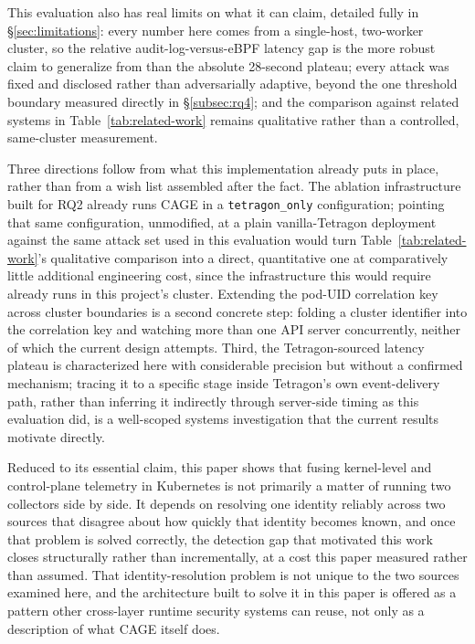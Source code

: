 \documentclass{ieeeaccess}
\begin{document}
This evaluation also has real limits on what it can claim, detailed
fully in \S\ref{sec:limitations}: every number here comes from a
single-host, two-worker cluster, so the relative audit-log-versus-eBPF
latency gap is the more robust claim to generalize from than the
absolute 28-second plateau; every attack was fixed and disclosed
rather than adversarially adaptive, beyond the one threshold boundary
measured directly in \S\ref{subsec:rq4}; and the comparison against
related systems in Table~\ref{tab:related-work} remains qualitative
rather than a controlled, same-cluster measurement.

Three directions follow from what this implementation already puts in
place, rather than from a wish list assembled after the fact. The
ablation infrastructure built for RQ2 already runs CAGE in a
\texttt{tetragon\_only} configuration; pointing that same configuration,
unmodified, at a plain vanilla-Tetragon deployment against the same
attack set used in this evaluation would turn
Table~\ref{tab:related-work}'s qualitative comparison into a direct,
quantitative one at comparatively little additional engineering cost,
since the infrastructure this would require already runs in this
project's cluster. Extending the pod-UID correlation key across
cluster boundaries is a second concrete step: folding a cluster
identifier into the correlation key and watching more than one API
server concurrently, neither of which the current design attempts.
Third, the Tetragon-sourced latency plateau is characterized here with
considerable precision but without a confirmed mechanism; tracing it
to a specific stage inside Tetragon's own event-delivery path, rather
than inferring it indirectly through server-side timing as this
evaluation did, is a well-scoped systems investigation that the
current results motivate directly.

Reduced to its essential claim, this paper shows that fusing kernel-level
and control-plane telemetry in Kubernetes is not primarily a matter of
running two collectors side by side. It depends on resolving one
identity reliably across two sources that disagree about how quickly
that identity becomes known, and once that problem is solved
correctly, the detection gap that motivated this work closes
structurally rather than incrementally, at a cost this paper measured
rather than assumed. That identity-resolution problem is not unique to
the two sources examined here, and the architecture built to solve it
in this paper is offered as a pattern other cross-layer runtime
security systems can reuse, not only as a description of what CAGE
itself does.
\end{document}
